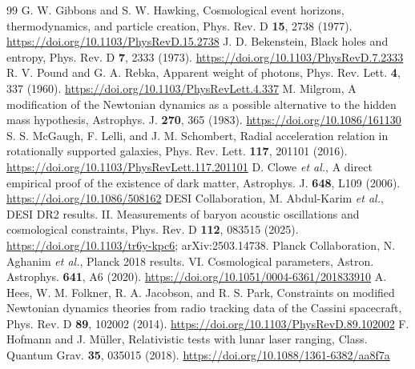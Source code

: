 \documentclass[aps,prd,twocolumn,superscriptaddress,nofootinbib,showkeys]{revtex4-2}
\begin{document}
\begin{thebibliography}{99}
 G. W. Gibbons and S. W. Hawking, Cosmological event horizons, thermodynamics, and particle creation, Phys. Rev. D \textbf{15}, 2738 (1977). \url{https://doi.org/10.1103/PhysRevD.15.2738}
 J. D. Bekenstein, Black holes and entropy, Phys. Rev. D \textbf{7}, 2333 (1973). \url{https://doi.org/10.1103/PhysRevD.7.2333}
 R. V. Pound and G. A. Rebka, Apparent weight of photons, Phys. Rev. Lett. \textbf{4}, 337 (1960). \url{https://doi.org/10.1103/PhysRevLett.4.337}
 M. Milgrom, A modification of the Newtonian dynamics as a possible alternative to the hidden mass hypothesis, Astrophys. J. \textbf{270}, 365 (1983). \url{https://doi.org/10.1086/161130}
 S. S. McGaugh, F. Lelli, and J. M. Schombert, Radial acceleration relation in rotationally supported galaxies, Phys. Rev. Lett. \textbf{117}, 201101 (2016). \url{https://doi.org/10.1103/PhysRevLett.117.201101}
 D. Clowe \emph{et al.}, A direct empirical proof of the existence of dark matter, Astrophys. J. \textbf{648}, L109 (2006). \url{https://doi.org/10.1086/508162}
 DESI Collaboration, M. Abdul-Karim \emph{et al.}, DESI DR2 results. II. Measurements of baryon acoustic oscillations and cosmological constraints, Phys. Rev. D \textbf{112}, 083515 (2025). \url{https://doi.org/10.1103/tr6y-kpc6}; arXiv:2503.14738.
 Planck Collaboration, N. Aghanim \emph{et al.}, Planck 2018 results. VI. Cosmological parameters, Astron. Astrophys. \textbf{641}, A6 (2020). \url{https://doi.org/10.1051/0004-6361/201833910}
 A. Hees, W. M. Folkner, R. A. Jacobson, and R. S. Park, Constraints on modified Newtonian dynamics theories from radio tracking data of the Cassini spacecraft, Phys. Rev. D \textbf{89}, 102002 (2014). \url{https://doi.org/10.1103/PhysRevD.89.102002}
 F. Hofmann and J. M\"uller, Relativistic tests with lunar laser ranging, Class. Quantum Grav. \textbf{35}, 035015 (2018). \url{https://doi.org/10.1088/1361-6382/aa8f7a}
\end{thebibliography}
\end{document}
